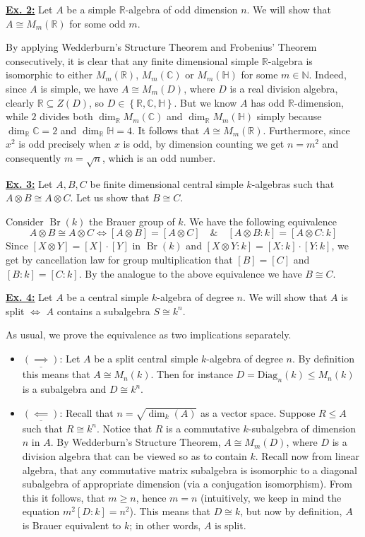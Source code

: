 \documentclass[a4paper, 12pt]{article}
\DeclareMathOperator{\Br}{Br}
\newcommand{\N}{\mathbb{N}}
\newcommand{\R}{\mathbb{R}}
\newcommand{\C}{\mathbb{C}}
\renewcommand{\H}{\mathbb{H}}
\newcommand{\iso}{\cong}
\begin{document}
\underline{\textbf{Ex. 2:}}
Let $A$ be a simple $\R$-algebra of odd dimension $n$.
We will show that $A \iso M_m(\R)$ for some odd $m$.

By applying Wedderburn's Structure Theorem and Frobenius' Theorem consecutively,
it is clear that any finite dimensional simple $\R$-algebra is isomorphic to either $M_m(\R)$, $M_m(\C)$ or $M_m(\H)$ for some $m \in \N$.
Indeed, since $A$ is simple, we have $A \iso M_m(D)$, where $D$ is a real division algebra, clearly $\R \subseteq Z(D)$, so $D \in \left\{ \R, \C, \H \right\}$.
But we know $A$ has odd $\R$-dimension, while $2$ divides both $\dim_\R M_m(\C)$ and $\dim_\R M_m(\H)$ simply because $\dim_\R \C = 2$ and $\dim_\R \H = 4$.
It follows that $A \iso M_m(\R)$.
Furthermore, since $x^2$ is odd precisely when $x$ is odd, by dimension counting we get $n = m^2$ and consequently $m = \sqrt{n}$, which is an odd number.
\newline

\underline{\textbf{Ex. 3:}}
Let $A, B, C$ be finite dimensional central simple $k$-algebras such that $A \otimes B \iso A \otimes C$.
Let us show that $B \iso C$.

Consider $\Br(k)$ the Brauer group of $k$.
We have the following equivalence
\[
    A \otimes B \iso A \otimes C \iff [A \otimes B ] = [A \otimes C] \quad\&\quad [A\otimes B : k] = [A \otimes C : k]
\]
Since $[X \otimes Y] = [X]\cdot [Y]$ in $\Br(k)$ and $[X \otimes Y : k] = [X : k] \cdot [Y : k]$, we get by cancellation law for group multiplication that $[B] = [C]$ and $[B : k] = [C : k]$. By the analogue to the above equivalence we have $B \iso C$.
\newline

\underline{\textbf{Ex. 4:}}
Let $A$ be a central simple $k$-algebra of degree $n$.
We will show that $A$ is split $\iff$  $A$ contains a subalgebra $S \iso k^n$.

As usual, we prove the equivalence as two implications separately.
\begin{itemize}
    \item $\underline{(\implies)}$:
        Let $A$ be a split central simple $k$-algebra of degree $n$. By definition this means that $A \iso M_n(k)$.
        Then for instance $D = \text{Diag}_n(k) \leq M_n(k)$ is a subalgebra and $D \iso k^n$.
    \item $\underline{(\impliedby)}$:
        Recall that $n = \sqrt{\dim_k(A)}$ as a vector space.
        Suppose $R \leq A$ such that $R \iso k^n$.
        Notice that $R$ is a commutative $k$-subalgebra of dimension $n$ in $A$.
        By Wedderburn's Structure Theorem, $A \iso M_m(D)$, where $D$ is a division algebra that can be viewed so as to contain $k$.
        Recall now from linear algebra, that any commutative matrix subalgebra is isomorphic to a diagonal subalgebra of appropriate dimension (via a conjugation isomorphism).
        From this it follows, that $m \geq n$, hence $m = n$ (intuitively, we keep in mind the equation $m^2 [D : k] = n^2$).
        This means that $D \iso k$, but now by definition, $A$ is Brauer equivalent to $k$; in other words, $A$ is split.
\end{itemize}
\end{document}
